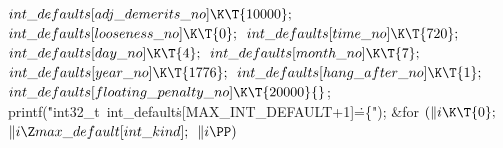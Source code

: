 ${}\index{int defaults+\\{int\_defaults}}\\{int\_defaults}[\\{adj\_demerits\_no}]\K\T{10000};{}$\6
${}\index{int defaults+\\{int\_defaults}}\\{int\_defaults}[\index{looseness no+\\{looseness\_no}}\\{looseness\_no}]\K\T{0};{}$\6
${}\index{int defaults+\\{int\_defaults}}\\{int\_defaults}[\index{time no+\\{time\_no}}\\{time\_no}]\K\T{720};{}$\6
${}\index{int defaults+\\{int\_defaults}}\\{int\_defaults}[\index{day no+\\{day\_no}}\\{day\_no}]\K\T{4};{}$\6
${}\index{int defaults+\\{int\_defaults}}\\{int\_defaults}[\index{month no+\\{month\_no}}\\{month\_no}]\K\T{7};{}$\6
${}\index{int defaults+\\{int\_defaults}}\\{int\_defaults}[\index{year no+\\{year\_no}}\\{year\_no}]\K\T{1776};{}$\6
${}\index{int defaults+\\{int\_defaults}}\\{int\_defaults}[\index{hang after no+\\{hang\_after\_no}}\\{hang\_after\_no}]\K\T{1};{}$\6
${}\index{int defaults+\\{int\_defaults}}\\{int\_defaults}[\index{floating penalty no+\\{floating\_penalty\_no}}\\{floating\_penalty\_no}]\K\T{20000}{}$;\7
\\{printf}(\.{"int32\_t\ int\_default}\)\.{s[MAX\_INT\_DEFAULT+1]}\)\.{=\{"});\6
\&{for} ${}(\|i\K\T{0};{}$ ${}\|i\Z\index{max default+\\{max\_default}}\\{max\_default}[\index{int kind+\\{int\_kind}}\\{int\_kind}];{}$ ${}\|i\PP){}$\5
